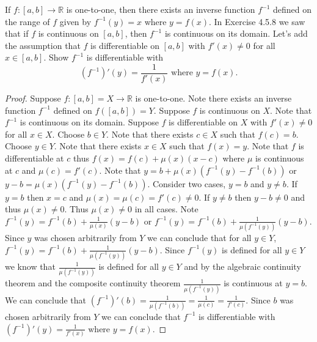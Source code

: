 \documentclass[12pt]{article}
\theoremstyle{homework}
\begin{document}
If $f:[a,b] \to \mathbb{R}$ is one-to-one, then there exists an inverse function $f^{-1}$ defined on the range of $f$ given by $f^{-1}(y) = x$ where $y = f(x)$. In Exercise 4.5.8 we saw that if $f$ is continuous on $[a,b]$, then $f^{-1}$ is continuous on its domain. Let's add the assumption that $f$ is differentiable on $[a,b]$ with $f'(x)\neq 0$ for all $x \in [a,b]$. Show $f^{-1}$ is differentiable with $$(f^{-1})'(y) = \frac{1}{f'(x)} \text{ where } y=f(x).$$
\begin{proof}
Suppose $f:[a,b]=X \to \mathbb{R}$ is one-to-one.  Note there exists an inverse function $f^{-1}$ defined on $f([a,b])=Y$.  Suppose $f$ is continuous on $X$.  Note that $f^{-1}$ is continuous on its domain.  Suppose $f$ is differentiable on $X$ with $f'(x)\neq 0$ for all $x \in X$.  Choose $b\in Y$.  Note that there exists $c\in X$ such that $f(c)=b$.  Choose $y\in Y$.  Note that there exists $x\in X$ such that $f(x)=y$.  Note that $f$ is differentiable at $c$ thus $f(x)=f(c)+\mu(x)(x-c)$ where $\mu$ is continuous at $c$ and $\mu(c)=f'(c)$.  Note that $y=b+\mu(x)(f^{-1}(y)-f^{-1}(b))$ or $y-b=\mu(x)(f^{-1}(y)-f^{-1}(b))$.  Consider two cases, $y=b$ and $y\neq b$.  If $y=b$ then $x=c$ and $\mu(x)=\mu(c)=f'(c)\neq 0$.  If $y\neq b$ then $y-b\neq 0$ and thus $\mu(x)\neq 0$.  Thus $\mu(x)\neq 0$ in all cases.  Note $f^{-1}(y)=f^{-1}(b)+\frac{1}{\mu(x)}(y-b)$ or $f^{-1}(y)=f^{-1}(b)+\frac{1}{\mu(f^{-1}(y))}(y-b)$.  Since $y$ was chosen arbitrarily from $Y$ we can conclude that for all $y\in Y$, $f^{-1}(y)=f^{-1}(b)+\frac{1}{\mu(f^{-1}(y))}(y-b)$.  Since $f^{-1}(y)$ is defined for all $y\in Y$ we know that $\frac{1}{\mu(f^{-1}(y))}$ is defined for all $y\in Y$ and by the algebraic continuity theorem and the composite continuity theorem $\frac{1}{\mu(f^{-1}(y))}$ is continuous at $y=b$.  We can conclude that $(f^{-1})'(b) = \frac{1}{\mu(f^{-1}(b))}=\frac{1}{\mu(c)}=\frac{1}{f'(c)}$.  Since $b$ was chosen arbitrarily from $Y$ we can conclude that $f^{-1}$ is differentiable with $(f^{-1})'(y) = \frac{1}{f'(x)} \text{ where } y=f(x)$.
\end{proof}
\end{document}
